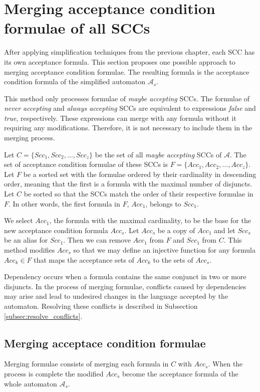 \documentclass[
  digital, %
  twoside, %
  table,   %
  lof,     %
  lot,     %
]{fithesis3}
\begin{document}
\section{Merging acceptance condition formulae of all SCCs}
\label{sec:merging_formulae}
After applying simplification techniques from the previous chapter, each SCC has its own acceptance formula. This section proposes one possible approach to merging acceptance condition formulae. The resulting formula is the acceptance condition formula of the simplified automaton $\mathcal{A}_s$.

This method only processes formulae of \emph{maybe accepting} SCCs. The formulae of \emph{never accepting} and \emph{always accepting} SCCs are equivalent to expressions \emph{false} and \emph{true}, respectively. These expressions can merge with any formula without it requiring any modifications. Therefore, it is not necessary to include them in the merging process. 

Let $C = \{Scc_1, Scc_2, \dots, Scc_z\}$ be the set of all \emph{maybe accepting} SCCs of $\mathcal{A}$. The set of acceptance condition formulae of these SCCs is $F = \{Acc_1, Acc_2, \dots, Acc_z\}$. Let $F$ be a sorted set with the formulae ordered by their cardinality in descending order, meaning that the first is a formula with the maximal number of disjuncts. Let $C$ be sorted so that the SCCs match the order of their respective formulae in $F$. In other words, the first formula in $F$, $Acc_1$, belongs to $Scc_1$.

We select $Acc_1$, the formula with the maximal cardinality, to be the base for the new acceptance condition formula $Acc_s$. Let $Acc_s$ be a copy of $Acc_1$ and let $Scc_s$ be an alias for $Scc_1$. Then we can remove $Acc_1$ from $F$ and $Scc_1$ from $C$. This method modifies $Acc_s$ so that we may define an injective function for any formula $Acc_k \in F$ that maps the acceptance sets of $Acc_k$ to the sets of $Acc_s$. 

Dependency occurs when a formula contains the same conjunct in two or more disjuncts. In the process of merging formulae, conflicts caused by dependencies may arise and lead to undesired changes in the language accepted by the automaton. Resolving these conflicts is described in Subsection \ref{subsec:resolve_conflicts}. 

\subsection{Merging acceptace condition formulae}
Merging formulae consists of merging each formula in $C$ with $Acc_s$. When the process is complete the modified $Acc_s$ become the acceptance formula of the whole automaton $\mathcal{A}_s$.
\end{document}
